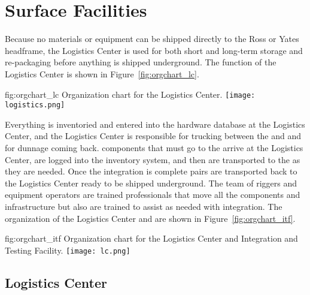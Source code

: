 \section{Surface Facilities}

Because no materials or equipment can be  shipped directly to the Ross or
Yates headframe, the Logistics Center is used for both short and
long-term storage and re-packaging before anything is shipped underground.
The function of the Logistics Center is shown in
Figure~\ref{fig:orgchart_lc}.
\begin{dunefigure}{fig:orgchart_lc}
  {Organization chart for the Logistics Center.}
  \texttt{[image: logistics.png]}
\end{dunefigure}
Everything is inventoried and
entered into the hardware database at the Logistics Center, and the Logistics Center is 
responsible for trucking between the  and \surf and for dunnage coming
back.    components that must go to the  arrive at the Logistics Center, are logged into the inventory
system, and then are transported to the  as they are needed. Once the integration is
complete  pairs are transported back to the Logistics Center ready
to be shipped underground.  The team of riggers and equipment operators
are trained professionals that move all the  components and
infrastructure but also are trained to assist as needed with integration. The organization of the Logistics Center and  are shown in Figure~\ref{fig:orgchart_itf}.
\begin{dunefigure}{fig:orgchart_itf}
  {Organization chart for the Logistics Center and Integration and Testing
    Facility.}  \texttt{[image: lc.png]}
\end{dunefigure}

\subsection{Logistics Center}

